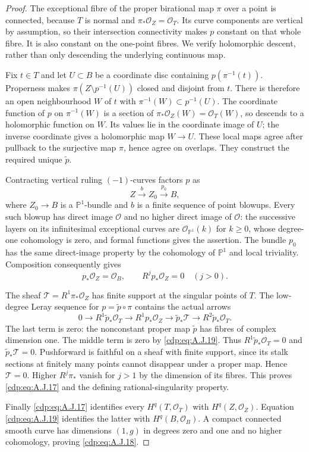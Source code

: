 \begin{proof}
The exceptional fibre of the proper birational map $\pi$
over a point is connected, because $T$ is normal and
$\pi_*\mathcal O_Z=\mathcal O_T$. Its curve components
are vertical by assumption, so their intersection
connectivity makes $p$ constant on that whole fibre.
It is also constant on the one-point fibres. We verify
holomorphic descent, rather than only descending the
underlying continuous map.

Fix $t\in T$ and let $U\subset B$ be a coordinate disc
containing $p(\pi^{-1}(t))$. Properness makes
$\pi(Z\setminus p^{-1}(U))$ closed and disjoint from
$t$. There is therefore an open neighbourhood $W$ of $t$
with $\pi^{-1}(W)\subset p^{-1}(U)$. The coordinate
function of $p$ on $\pi^{-1}(W)$ is a section of
$\pi_*\mathcal O_Z(W)=\mathcal O_T(W)$, so descends
to a holomorphic function on $W$. Its values lie in the
coordinate image of $U$; the inverse coordinate gives a
holomorphic map $W\to U$. These local maps agree after
pullback to the surjective map $\pi$, hence agree on
overlaps. They construct the required unique
$\widetilde p$.

Contracting vertical ruling $(-1)$-curves factors $p$ as
\[
 Z\xrightarrow{b} Z_0\xrightarrow{p_0}B,
\]
where $Z_0\to B$ is a $\mathbb P^1$-bundle and $b$
is a finite sequence of point blowups. Every such blowup
has direct image $\mathcal O$ and no higher direct image
of $\mathcal O$: the successive layers on its
infinitesimal exceptional curves are
$\mathcal O_{\mathbb P^1}(k)$ for $k\geq0$, whose
degree-one cohomology is zero, and formal functions gives
the assertion. The bundle $p_0$ has the same direct-image
property by the cohomology of $\mathbb P^1$ and local
triviality. Composition consequently gives
\[
 p_*\mathcal O_Z=\mathcal O_B,
 \qquad R^j p_*\mathcal O_Z=0\quad(j>0).          \tag{A.J.19}\label{cdp:eq:A.J.19}
\]

The sheaf $\mathcal T=R^1\pi_*\mathcal O_Z$ has
finite support at the singular points of $T$. The
low-degree Leray sequence for $p=\widetilde p\circ\pi$
contains the actual arrows
\[
 0\longrightarrow R^1\widetilde p_*\mathcal O_T
 \longrightarrow R^1p_*\mathcal O_Z
 \longrightarrow\widetilde p_*\mathcal T
 \longrightarrow R^2\widetilde p_*\mathcal O_T.    \tag{A.J.20}\label{cdp:eq:A.J.20}
\]
The last term is zero: the nonconstant proper map
$\widetilde p$ has fibres of complex dimension one.
The middle term is zero by \eqref{cdp:eq:A.J.19}. Thus
$R^1\widetilde p_*\mathcal O_T=0$ and
$\widetilde p_*\mathcal T=0$. Pushforward is faithful
on a sheaf with finite support, since its stalk sections
at finitely many points cannot disappear under a proper
map. Hence $\mathcal T=0$. Higher $R^j\pi_*$ vanish
for $j>1$ by the dimension of its fibres. This proves
\eqref{cdp:eq:A.J.17} and the defining rational-singularity property.

Finally \eqref{cdp:eq:A.J.17} identifies every
$H^q(T,\mathcal O_T)$ with $H^q(Z,\mathcal O_Z)$.
Equation \eqref{cdp:eq:A.J.19} identifies the latter with
$H^q(B,\mathcal O_B)$. A compact connected smooth curve
has dimensions $(1,g)$ in degrees zero and one and no
higher cohomology, proving \eqref{cdp:eq:A.J.18}.
\end{proof}


